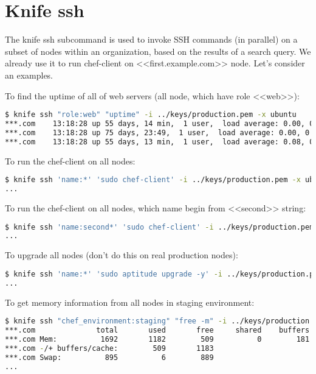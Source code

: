 \section{Knife ssh}
\label{sec:server-knife-ssh}

The knife ssh subcommand is used to invoke SSH commands (in parallel) on a subset of nodes within an organization, based on the results of a search query. We already use it to run chef-client on <<first.example.com>> node. Let's consider an examples.

To find the uptime of all of web servers (all node, which have role <<web>>):

\begin{lstlisting}[language=Bash,label=lst:my-server-cloud-knife-ssh1]
$ knife ssh "role:web" "uptime" -i ../keys/production.pem -x ubuntu
***.com    13:18:28 up 55 days, 14 min,  1 user,  load average: 0.00, 0.01, 0.05
***.com    13:18:28 up 75 days, 23:49,  1 user,  load average: 0.00, 0.01, 0.05
***.com    13:18:28 up 55 days, 13 min,  1 user,  load average: 0.08, 0.03, 0.05
\end{lstlisting}

To run the chef-client on all nodes:

\begin{lstlisting}[language=Bash,label=lst:my-server-cloud-knife-ssh2]
$ knife ssh 'name:*' 'sudo chef-client' -i ../keys/production.pem -x ubuntu
...
\end{lstlisting}

To run the chef-client on all nodes, which name begin from <<second>> string:

\begin{lstlisting}[language=Bash,label=lst:my-server-cloud-knife-ssh3]
$ knife ssh 'name:second*' 'sudo chef-client' -i ../keys/production.pem -x ubuntu
...
\end{lstlisting}

To upgrade all nodes (don't do this on real production nodes):

\begin{lstlisting}[language=Bash,label=lst:my-server-cloud-knife-ssh4]
$ knife ssh 'name:*' 'sudo aptitude upgrade -y' -i ../keys/production.pem -x ubuntu
...
\end{lstlisting}

To get memory information from all nodes in staging environment:

\begin{lstlisting}[language=Bash,label=lst:my-server-cloud-knife-ssh5]
$ knife ssh "chef_environment:staging" "free -m" -i ../keys/production.pem -x ubuntu
***.com              total       used       free     shared    buffers     cached
***.com Mem:          1692       1182        509          0        181        491
***.com -/+ buffers/cache:        509       1183
***.com Swap:          895          6        889
...
\end{lstlisting}

